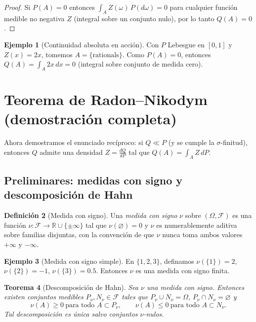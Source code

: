 \documentclass[11pt,a4paper]{article}
\theoremstyle{plain}
\newtheorem{theorem}{Teorema}[section]
\theoremstyle{definition}
\newtheorem{definition}[theorem]{Definición}
\newtheorem{example}[theorem]{Ejemplo}
\theoremstyle{remark}
\newcommand{\1}{\mathbf{1}}
\newcommand{\RR}{\mathbb{R}}
\newcommand{\cF}{\mathcal{F}}
\begin{document}
\begin{proof}
Si $P(A)=0$ entonces $\int_A Z(\omega)\,P(d\omega)=0$ para cualquier función medible no negativa $Z$ (integral sobre un conjunto nulo), por lo tanto $Q(A)=0$.
\end{proof}

\begin{example}[Continuidad absoluta en acción]
Con $P$ Lebesgue en $[0,1]$ y $Z(x)=2x$, tomemos $A=\{\text{rationals}\}$. Como $P(A)=0$, entonces $Q(A)=\int_A 2x\,dx=0$ (integral sobre conjunto de medida cero).
\end{example}

\section{Teorema de Radon--Nikodym (demostración completa)}

Ahora demostramos el enunciado recíproco: si $Q\ll P$ (y se cumple la $\sigma$-finitud), entonces $Q$ admite una densidad $Z=\frac{dQ}{dP}$ tal que $Q(A)=\int_A Z\,dP$.

\subsection{Preliminares: medidas con signo y descomposición de Hahn}

\begin{definition}[Medida con signo]
Una \emph{medida con signo} $\nu$ sobre $(\Omega,\cF)$ es una función $\nu:\cF\to\RR\cup\{\pm\infty\}$ tal que $\nu(\varnothing)=0$ y $\nu$ es numerablemente aditiva sobre familias disjuntas, con la convención de que $\nu$ nunca toma ambos valores $+\infty$ y $-\infty$.
\end{definition}

\begin{example}[Medida con signo simple]
En $\{1,2,3\}$, definamos $\nu(\{1\})=2$, $\nu(\{2\})=-1$, $\nu(\{3\})=0.5$. Entonces $\nu$ es una medida con signo finita.
\end{example}

\begin{theorem}[Descomposición de Hahn]
\label{thm:Hahn}
Sea $\nu$ una medida con signo. Entonces existen conjuntos medibles $P_\nu,N_\nu\in\cF$ tales que $P_\nu\cup N_\nu=\Omega$, $P_\nu\cap N_\nu=\varnothing$ y
\[
\nu(A)\ge0\ \text{para todo }A\subset P_\nu,\qquad
\nu(A)\le0\ \text{para todo }A\subset N_\nu.
\]
Tal descomposición es única salvo conjuntos $\nu$-nulos.
\end{theorem}
\end{document}
